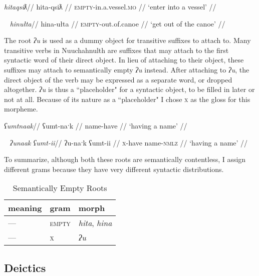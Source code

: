 \ex \label{ex:entervessel}
\begingl
\glpreamble \textit{hitaqsiƛ}//
\gla hita-qsiƛ //
\glb \textsc{empty}-in.a.vessel.\textsc{mo} //
\glft `enter into a vessel' //
\endgl
\xe

\ex~ \label{ex:outofcanoe}
\begingl
\glpreamble \textit{hinułta}//
\gla hina-ułta //
\glb \textsc{empty}-out.of.canoe //
\glft `get out of the canoe' //
\endgl
\xe

The root \textit{ʔu} is used as a dummy object for transitive suffixes to attach to. Many transitive verbs in Nuuchahnulth are suffixes that may attach to the first syntactic word of their direct object. In lieu of attaching to their object, these suffixes may attach to semantically empty \textit{ʔu} instead. After attaching to \textit{ʔu}, the direct object of the verb may be expressed as a separate word, or dropped altogether. \textit{ʔu} is thus a ``placeholder" for a syntactic object, to be filled in later or not at all. Because of its nature as a ``placeholder" I chose \textsc{x} as the gloss for this morpheme.

\ex \label{havename1}
\begingl
\glpreamble \textit{ʕumtnaak}//
\gla ʕumt-naˑk //
\glb name-have //
\glft `having a name' //
\endgl
\xe

\ex~ \label{havename2}
\begingl
\glpreamble \textit{ʔunaak ʕumt-ii}//
\gla ʔu-naˑk ʕumt-ii //
\glb \textsc{x}-have name-\textsc{nmlz} //
\glft `having a name' //
\endgl
\xe

To summarize, although both these roots are semantically contentless, I assign different grams because they have very different syntactic distributions.

\begin{table}[ht]
\centering
\caption{Semantically Empty Roots}
\label{table:augdim}
\begin{tabular}{lll}
meaning                            & gram               & morph                                         \\ \hline
\multicolumn{1}{|l|}{---} & \multicolumn{1}{l|}{\textsc{empty}}   & \multicolumn{1}{l|}{\textit{hita}, \textit{hina}}                   \\ \hline
\multicolumn{1}{|l|}{---} & \multicolumn{1}{l|}{\textsc{x}}   & \multicolumn{1}{l|}{\textit{ʔu}}                   \\ \hline
\end{tabular}
\end{table}

\subsection{Deictics}


